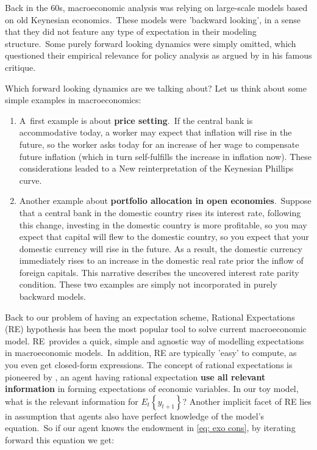 \documentclass[a4paper,12pt]{article}%
\begin{document}
Back in the 60s, macroeconomic analysis was relying on large-scale models
based on old Keynesian economics.\ These models were 'backward looking', in a
sense that they did not feature any type of expectation in their modeling
structure.\ Some purely forward looking dynamics were simply omitted, which
questioned their empirical relevance for policy analysis as argued by
\cite{lucas1976econometric} in his famous critique.

Which forward looking dynamics are we talking about? Let us think about some
simple examples in macroeconomics:

\begin{enumerate}
\item A\ first example is about \textbf{price setting}.\ If the central bank
is accommodative today, a worker may expect that inflation will rise in the
future, so the worker asks today for an increase of her wage to compensate
future inflation (which in turn self-fulfills the increase in inflation now).
These considerations leaded to a New reinterpretation of the Keynesian
Phillips curve.

\item Another example about\textbf{ portfolio allocation in open
economies}.\ Suppose that a central bank in the domestic country rises its
interest rate, following this change, investing in the domestic country is
more profitable, so you may expect that capital will flew to the domestic
country, so you expect that your domestic currency will rise in the future. As
a result, the domestic currency immediately rises to an increase in the
domestic real rate prior the inflow of foreign capitals. This narrative
describes the uncovered interest rate parity condition. These two examples are
simply not incorporated in purely backward models.
\end{enumerate}

Back to our problem of having an expectation scheme, Rational Expectations
(RE) hypothesis has been the most popular tool to solve current macroeconomic
model. RE\ provides a quick, simple and agnostic way of modelling expectations
in macroeconomic models.\ In addition, RE are typically 'easy' to compute, as
you even get closed-form expressions. The concept of rational expectations is
pioneered by \cite{muth1961rational}, an agent having rational expectation
\textbf{use all relevant information} in forming expectations of economic
variables. In our toy model, what is the relevant information for
$E_{t}\left\{  y_{t+1}\right\}  $? Another implicit facet of RE lies in
assumption that agents also have perfect knowledge of the model's
equation.\ So if our agent knows the endowment in \autoref{eq: exo cons}, by
iterating forward this equation we get:%
\end{document}
